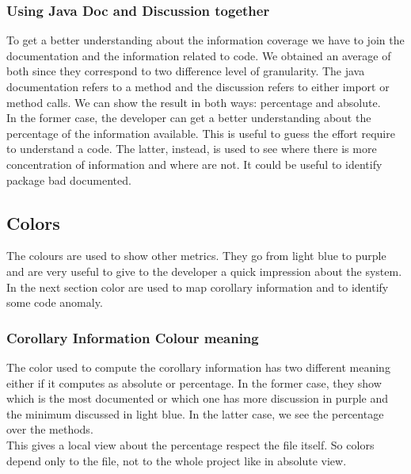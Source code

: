 \documentclass[]{usiinfbachelorproject}
\begin{document}
\subsubsection{Using Java Doc and Discussion together}
To get a better understanding about the information coverage we have to join the documentation and the information related to code. We obtained an average of both since they correspond to two difference level of granularity. The java documentation refers to a method and the discussion refers to either import or method calls. We can show the result in both ways: percentage and absolute.\\
In the former case, the developer can get a better understanding about the percentage of the information available. This is useful to guess the effort require to understand a code. The latter, instead, is used to see where there is more concentration of information and where are not. It could be useful to identify package bad documented.

  

\newpage

\subsection{Colors}
The colours are used to show other metrics. They go from light blue to purple and are very useful to give to the developer a quick impression about the system. In the next section color are used to map corollary information and to identify some code anomaly.


\subsubsection{Corollary Information Colour meaning}
The color used to compute the corollary information has two different meaning either if it computes as absolute or percentage. In the former case, they show which is the most documented or which one has more discussion in purple and the minimum discussed in light blue. In the latter case, we see the percentage over the methods.\\ This gives a local view about the percentage respect the file itself. So colors depend only to the file, not to the whole project like in absolute view.\\
\end{document}
